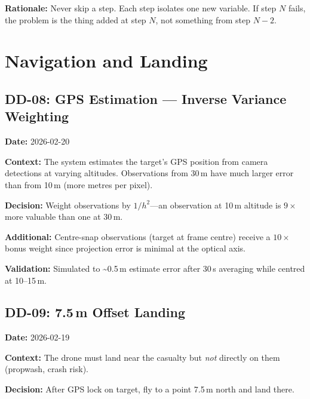 \documentclass[10pt,a4paper]{article}
\newcommand{\ddlabel}[1]{\textbf{\color{headblue}#1}\hspace{0.5em}}
\begin{document}
\ddlabel{Rationale:} Never skip a step. Each step isolates one new variable. If step $N$ fails, the problem is the thing added at step $N$, not something from step $N{-}2$.

\section{Navigation and Landing}

\subsection{DD-08: GPS Estimation --- Inverse Variance Weighting}
\label{sec:dd08}

\ddlabel{Date:} 2026-02-20

\ddlabel{Context:} The system estimates the target's GPS position from camera detections at varying altitudes. Observations from 30\,m have much larger error than from 10\,m (more metres per pixel).

\begin{decisionbox}
\textbf{Decision:} Weight observations by $1/h^{2}$---an observation at 10\,m altitude is $9\times$ more valuable than one at 30\,m.
\end{decisionbox}

\ddlabel{Additional:} Centre-snap observations (target at frame centre) receive a $10\times$ bonus weight since projection error is minimal at the optical axis.

\ddlabel{Validation:} Simulated to \textasciitilde0.5\,m estimate error after 30\,s averaging while centred at 10--15\,m.

\subsection{DD-09: 7.5\,m Offset Landing}
\label{sec:dd09}

\ddlabel{Date:} 2026-02-19

\ddlabel{Context:} The drone must land near the casualty but \emph{not} directly on them (propwash, crash risk).

\begin{decisionbox}
\textbf{Decision:} After GPS lock on target, fly to a point 7.5\,m north and land there.
\end{decisionbox}
\end{document}
